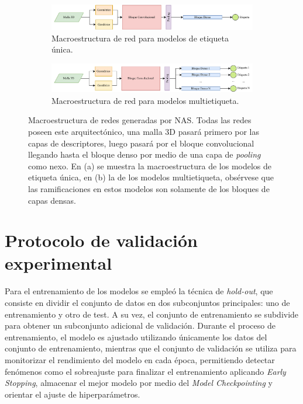 \begin{figure}[h]
    \begin{subfigure}{\textwidth}
        \centering
        \includegraphics[width=\linewidth]{figures/4_materials-methods/NAS_sample1.pdf}
        \caption{Macroestructura de red para modelos de etiqueta única.}
        \label{single_label_nets}
    \end{subfigure}

    \begin{subfigure}{\textwidth}
        \centering
        \includegraphics[width=\linewidth]{figures/4_materials-methods/NAS_sample2.pdf}
        \caption{Macroestructura de red para modelos multietiqueta.}
        \label{multi_label_nets}
    \end{subfigure}
    \caption[Macroestructura de redes generadas por NAS]{Macroestructura de redes generadas por NAS. Todas las redes poseen este  arquitectónico, una malla 3D pasará primero por las capas de descriptores, luego pasará por el bloque convolucional llegando hasta el bloque denso por medio de una capa de \textit{pooling} como nexo. En (a) se muestra la macroestructura de los modelos de etiqueta única, en (b) la de los modelos multietiqueta, obsérvese que las ramificaciones en estos modelos son solamente de los bloques de capas densas.}
    \label{nas_macrostruct}
\end{figure}


\section{Protocolo de validación experimental}
Para el entrenamiento de los modelos se empleó la técnica de \textit{hold-out}, que consiste en dividir el conjunto de datos en dos subconjuntos principales: uno de entrenamiento y otro de test. A su vez, el conjunto de entrenamiento se subdivide para obtener un subconjunto adicional de validación. Durante el proceso de entrenamiento, el modelo es ajustado utilizando únicamente los datos del conjunto de entrenamiento, mientras que el conjunto de validación se utiliza para monitorizar el rendimiento del modelo en cada época, permitiendo detectar fenómenos como el sobreajuste para finalizar el entrenamiento aplicando \textit{Early Stopping}, almacenar el mejor modelo por medio del \textit{Model Checkpointing} y orientar el ajuste de hiperparámetros.

